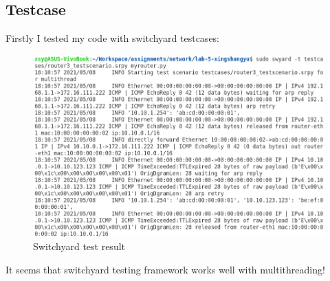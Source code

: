 \documentclass[12pt,a4paper,UTF8]{article}
\begin{document}
\subsection{Testcase}
Firstly I tested my code with switchyard testcases:
\begin{figure}[htbp]
	\centering
	\includegraphics[width=\textwidth]{1}
	\caption{Switchyard test result}
\end{figure}
\newpage
It seems that switchyard testing framework works well with multithreading!
\end{document}
